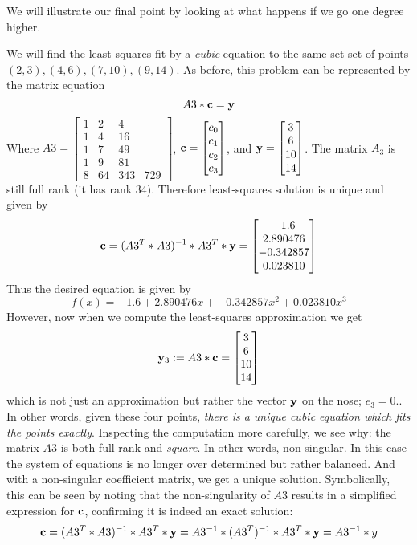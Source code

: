 \documentclass{ximera}
\begin{document}
We will illustrate our final point by looking at what happens if we go one degree higher.

\begin{example} We will find the least-squares fit by a {\it cubic} equation to the same set set of points $(2,3), (4,6), (7,10), (9,14)$. As before, this problem can be represented by the matrix equation
\[
A3*{\bf c} = {\bf y}
\]
Where $A3 = \begin{bmatrix} 1 & 2 & 4\\1 & 4 & 16\\1 & 7 & 49\\1 & 9 & 81\\8 & 64 & 343 & 729\end{bmatrix}$, ${\bf c} = \begin{bmatrix}c_0\\c_1\\c_2\\c_3\end{bmatrix}$, and ${\bf y} = \begin{bmatrix} 3\\6\\10\\14\end{bmatrix}$. The matrix $A_3$ is still full rank (it has rank 34). Therefore least-squares solution is unique and given by
\[
{\bf c} = (A3^T*A3)^{-1}*A3^T*{\bf y} = \begin{bmatrix} -1.6\\ 2.890476\\-0.342857\\0.023810\end{bmatrix}
\]
Thus the desired equation is given by
\[
f(x) = -1.6 + 2.890476 x + -0.342857 x^2 + 0.023810 x^3
\]
However, now when we compute the least-squares approximation we get
\[
{\bf y}_3 := A3*{\bf c} = \begin{bmatrix} 3\\ 6\\ 10\\ 14\end{bmatrix}
\]
which is not just an approximation but rather the vector $\bf y$ on the nose; $e_3 = 0$.. In other words, given these four points, {\it there is a unique cubic equation which fits the points exactly}. Inspecting the computation more carefully, we see why: the matrix $A3$ is both full rank and {\it square}. In other words, non-singular. In this case the system of equations is no longer over determined but rather balanced. And with a non-singular coefficient matrix, we get a unique solution. Symbolically, this can be seen by noting that the non-singularity of $A3$ results in a simplified expression for $\bf c$, confirming it is indeed an exact solution:
\[
{\bf c} = (A3^T*A3)^{-1}*A3^T*{\bf y} = A3^{-1}*(A3^T)^{-1}*A3^T*{\bf y} = A3^{-1}*y
\]
\end{example}
\end{document}
